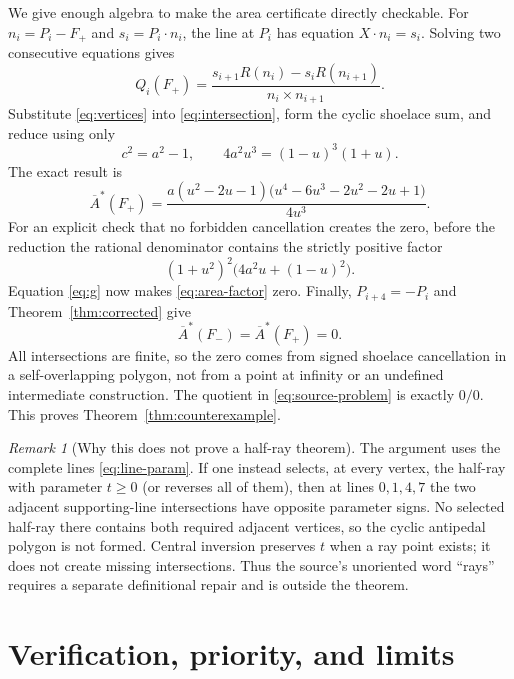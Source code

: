 \documentclass[11pt,a4paper]{amsart}
\theoremstyle{definition}
\theoremstyle{remark}
\newtheorem{remark}[theorem]{Remark}
\newcommand{\Abar}{\overline A}
\newcommand{\cross}{\mathbin{\times}}
\begin{document}
We give enough algebra to make the area certificate directly checkable.  For
$n_i=P_i-F_+$ and $s_i=P_i\cdot n_i$, the line at $P_i$ has equation
$X\cdot n_i=s_i$.  Solving two consecutive equations gives
\begin{equation}\label{eq:intersection}
 Q_i(F_+)=
 \frac{s_{i+1}R(n_i)-s_iR(n_{i+1})}{n_i\cross n_{i+1}}.
\end{equation}
Substitute \eqref{eq:vertices} into \eqref{eq:intersection}, form the cyclic
shoelace sum, and reduce using only
\begin{equation}\label{eq:relations}
 c^2=a^2-1,
 \qquad 4a^2u^3=(1-u)^3(1+u).
\end{equation}
The exact result is
\begin{equation}\label{eq:area-factor}
 \Abar^*(F_+)
 =\frac{a(u^2-2u-1)
 \bigl(u^4-6u^3-2u^2-2u+1\bigr)}{4u^3}.
\end{equation}
For an explicit check that no forbidden cancellation creates the zero, before
the reduction the rational denominator contains the strictly positive factor
\[
 (1+u^2)^2\bigl(4a^2u+(1-u)^2\bigr).
\]
Equation \eqref{eq:g} now makes \eqref{eq:area-factor} zero.  Finally,
$P_{i+4}=-P_i$ and Theorem~\ref{thm:corrected} give
\[
 \Abar^*(F_-)=\Abar^*(F_+)=0.
\]
All intersections are finite, so the zero comes from signed shoelace
cancellation in a self-overlapping polygon, not from a point at infinity or
an undefined intermediate construction.  The quotient in
\eqref{eq:source-problem} is exactly $0/0$.  This proves
Theorem~\ref{thm:counterexample}.

\begin{remark}[Why this does not prove a half-ray theorem]\label{rem:rays}
The argument uses the complete lines \eqref{eq:line-param}.  If one instead
selects, at every vertex, the half-ray with parameter $t\ge0$ (or reverses
all of them), then at lines $0,1,4,7$ the two adjacent supporting-line
intersections have opposite parameter signs.  No selected half-ray there
contains both required adjacent vertices, so the cyclic antipedal polygon is
not formed.  Central inversion preserves $t$ when a ray point exists; it does
not create missing intersections.  Thus the source's unoriented word
``rays'' requires a separate definitional repair and is outside the theorem.
\end{remark}

\section{Verification, priority, and limits}
\end{document}
